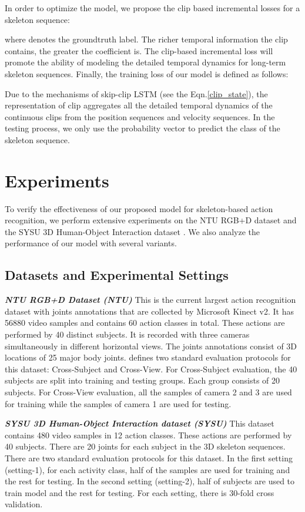 \documentclass[runningheads]{llncs}
\begin{document}
In order to optimize the model, we propose the clip based incremental losses for a skeleton sequence:

where  denotes the groundtruth label. The richer temporal information the clip contains, the greater the coefficient  is. The clip-based incremental loss will promote the ability of modeling the detailed temporal dynamics for long-term skeleton sequences. Finally, the training loss of our model is defined as follows:


Due to the mechanisms of skip-clip LSTM (see the Eqn.\ref{clip_state}), the representation  of clip  aggregates all the detailed temporal dynamics of the continuous clips from the position sequences and velocity sequences. In the testing process, we only use the probability vector  to predict the class of the skeleton sequence.


\section{Experiments}
\label{Experiments}
To verify the effectiveness of our proposed model for skeleton-based action recognition, we perform extensive experiments on the NTU RGB+D dataset \cite{Shahroudy2016NTU} and the SYSU 3D Human-Object Interaction dataset \cite{Hu2015Jointly}. We also analyze the performance of our model with several variants.

\subsection{Datasets and Experimental Settings}
\textbf{\emph{NTU RGB+D Dataset (NTU)}} \hspace{3mm}
This is the current largest action recognition dataset with joints annotations that are collected by Microsoft Kinect v2. It has 56880 video samples and contains 60 action classes in total. These actions are performed by 40 distinct subjects. It is recorded with three cameras simultaneously in different horizontal views. The joints annotations consist of 3D locations of 25 major body joints. \cite{Shahroudy2016NTU} defines two standard evaluation protocols for this dataset: Cross-Subject and Cross-View.
For Cross-Subject evaluation, the 40 subjects are split into training and testing groups. Each group consists of 20 subjects. For Cross-View evaluation, all the samples of camera 2 and 3 are used for training while the samples of camera 1 are used for testing.

\textbf{\emph{SYSU 3D Human-Object Interaction dataset (SYSU)}} \hspace{3mm}
This dataset contains 480 video samples in 12 action classes. These actions are performed by 40 subjects. There are 20 joints for each subject in the 3D skeleton sequences. There are two standard evaluation protocols \cite{Hu2015Jointly} for this dataset. In the first setting (setting-1),  for each activity class,  half of the samples are used for training and the rest for testing. In the second setting (setting-2), half of subjects are used to train model and the rest for testing. For each setting, there is 30-fold cross validation.
\end{document}
